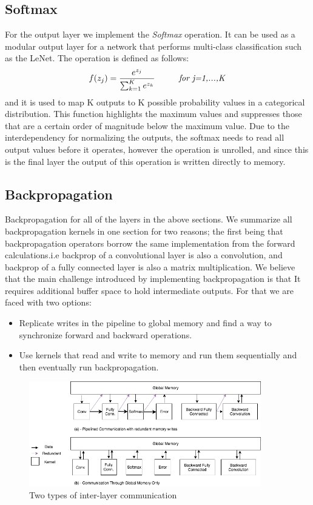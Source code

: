 \subsection{Softmax}

For the output layer we implement the \emph{Softmax} operation. It can be used as a modular output layer for a network that performs multi-class classification such as the LeNet. The operation is defined as follows: 
\begin{equation}
	f(z_j) = \frac{e^{z_j}}{\sum_{k=1}^{K} e^{z_k} } \hspace{1cm}  \mbox{\emph{for j=1,...,K}}
\end{equation}
and it is used to map K outputs to K possible probability values in a categorical distribution. This function highlights the maximum values and suppresses those that are a certain order of magnitude below the maximum value.  Due to the interdependency for normalizing the outputs, the softmax needs to read all output values before it operates, however the operation is unrolled, and since this is the final layer the output of this operation is written directly to memory.

\subsection{Backpropagation}

Backpropagation for all of the layers in the above sections. We summarize all backpropagation kernels in one section for two reasons; the first being that backpropagation operators borrow the same implementation from the forward calculations.i.e backprop of a convolutional layer is also a convolution, and backprop of a fully connected layer is also a matrix multiplication. We believe that the main challenge introduced by implementing backpropagation is that It requires additional buffer space to hold intermediate outputs. For that we are faced with two options:
\begin{itemize}
\item
Replicate writes in the pipeline to global memory and find a way to synchronize forward and backward operations.
\item
Use kernels that read and write to memory and run them sequentially and then eventually run backpropagation.
\end{itemize}

\begin{figure}[h]
\centering
\includegraphics[width=0.9\textwidth]{Figures/comm}
\caption[Types of inter-layer communication]{ Two types of inter-layer communication }
\label{fig:comm}
\end{figure}

